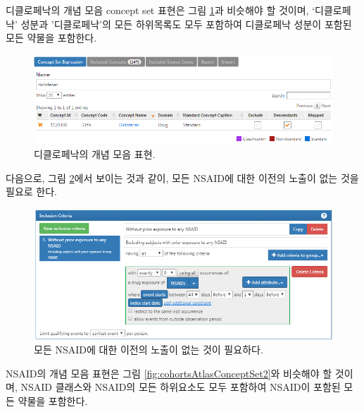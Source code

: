 \documentclass[10.5pt]{book}
\theoremstyle{definition}
\theoremstyle{definition}
\theoremstyle{definition}
\theoremstyle{remark}
\begin{document}
디클로페낙의 개념 모음 concept set 표현은 그림
\ref{fig:cohortsAtlasConceptSet1}과 비슷해야 할 것이며, `디클로페낙'
성분과 '디클로페낙'의 모든 하위목록도 모두 포함하여 디클로페낙 성분이
포함된 모든 약물을 포함한다.

\begin{figure}

{\centering \includegraphics[width=1\linewidth]{images/SuggestedAnswers/cohortsAtlasConceptSet1} 

}

\caption{디클로페낙의 개념 모음 표현.}\label{fig:cohortsAtlasConceptSet1}
\end{figure}

다음으로, 그림 \ref{fig:cohortsAtlasInclusion1}에서 보이는 것과 같이,
모든 NSAID에 대한 이전의 노출이 없는 것을 필요로 한다.

\begin{figure}

{\centering \includegraphics[width=1\linewidth]{images/SuggestedAnswers/cohortsAtlasInclusion1} 

}

\caption{모든 NSAID에 대한 이전의 노출이 없는 것이 필요하다.}\label{fig:cohortsAtlasInclusion1}
\end{figure}

NSAID의 개념 모음 표현은 그림 \ref{fig:cohortsAtlasConceptSet2}와
비슷해야 할 것이며, NSAID 클래스와 NSAID의 모든 하위요소도 모두 포함하여
NSAID이 포함된 모든 약물을 포함한다.
\end{document}
